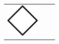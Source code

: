 \begin{longtable}{|m{}|m{}|m{}|}
    \\\hline
    \centering
    \includegraphics[width=0.75\linewidth]{chapters/4-MDC_model_application/image/bvl-spectral-o.png}
    &
    \centering

\end{longtable}
